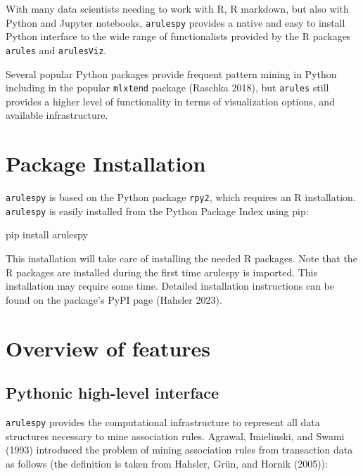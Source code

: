 \documentclass{article}
\newenvironment{Shaded}{\begin{snugshade}}{\end{snugshade}}
\newcommand{\ExtensionTok}[1]{#1}
\newcommand{\NormalTok}[1]{#1}
\begin{document}
With many data scientists needing to work with R, R markdown, but also
with Python and Jupyter notebooks, \texttt{arulespy} provides a native
and easy to install Python interface to the wide range of functionalists
provided by the R packages \texttt{arules} and \texttt{arulesViz}.

Several popular Python packages provide frequent pattern mining in
Python including in the popular \texttt{mlxtend} package (Raschka 2018),
but \texttt{arules} still provides a higher level of functionality in
terms of visualization options, and available infrastructure.

\hypertarget{package-installation}{%
\section{Package Installation}\label{package-installation}}

\texttt{arulespy} is based on the Python package \texttt{rpy2}, which
requires an R installation. \texttt{arulespy} is easily installed from
the Python Package Index using pip:

\begin{Shaded}
\begin{Highlighting}[]
\ExtensionTok{pip}\NormalTok{ install arulespy}
\end{Highlighting}
\end{Shaded}

This installation will take care of installing the needed R packages.
Note that the R packages are installed during the first time arulespy is
imported. This installation may require some time. Detailed installation
instructions can be found on the package's PyPI page (Hahsler 2023).

\hypertarget{overview-of-features}{%
\section{Overview of features}\label{overview-of-features}}

\hypertarget{pythonic-high-level-interface}{%
\subsection{Pythonic high-level
interface}\label{pythonic-high-level-interface}}

\texttt{arulespy} provides the computational infrastructure to represent
all data structures necessary to mine association rules. Agrawal,
Imielinski, and Swami (1993) introduced the problem of mining
association rules from transaction data as follows (the definition is
taken from Hahsler, Grün, and Hornik (2005)):
\end{document}

